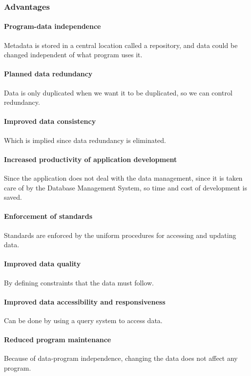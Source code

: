 \documentclass[12pt]{article}
\begin{document}
\subsubsection{Advantages}

\paragraph{Program-data independence} Metadata is stored in a central location called a repository, and data could be changed independent of what program uses it.

\paragraph{Planned data redundancy} Data is only duplicated when we want it to be duplicated, so we can control redundancy.

\paragraph{Improved data consistency} Which is implied since data redundancy is eliminated.

\paragraph{Increased productivity of application development} Since the application does not deal with the data management, since it is taken care of by the Database Management System, so time and cost of development is saved.

\paragraph{Enforcement of standards} Standards are enforced by the uniform procedures for accessing and updating data.

\paragraph{Improved data quality} By defining constraints that the data must follow.

\paragraph{Improved data accessibility and responsiveness} Can be done by using a query system to access data.

\paragraph{Reduced program maintenance} Because of data-program independence, changing the data does not affect any program.
\end{document}
